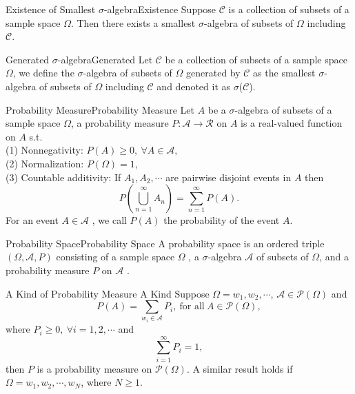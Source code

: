 \documentclass{elegantbook}
\newcommand\dis{\displaystyle}
\newcommand\gs{\geqslant}
\newcommand\sumn{\dis\sum\limits_{n=1}^{\infty}}
\newcommand\sumi{\dis\sum\limits_{i=1}^{\infty}}
\newcommand\ma{\mathcal{A}}
\newcommand\mr{\mathcal{R}}
\begin{document}
\begin{corollary}{Existence of Smallest $\sigma$-algebra}{Existence}
Suppose $\mathcal{C}$ is a collection of subsets of a sample space $\Omega$. Then there exists a smallest $\sigma$-algebra of subsets of $\Omega$ including $\mathcal{C}$.

\end{corollary}

\begin{definition}{Generated $\sigma$-algebra}{Generated}
Let $\mathcal{C}$ be a collection of subsets of a sample space $\Omega$, we define the $\sigma$-algebra of subsets of $\Omega$ generated by $\mathcal{C}$ as the smallest $\sigma$-algebra of subsets of $\Omega$ including $\mathcal{C}$ and denoted it as $\sigma$($\mathcal{C}$).

\end{definition}

\begin{definition}{Probability Measure}{Probability Measure}
Let $A$ be a $\sigma$-algebra of subsets of a sample space $\Omega$, a probability measure $P: \ma\rightarrow\mr$ on $A$ is a real-valued function on $A$ s.t.\\
(1) Nonnegativity: $P(A)\gs0,\ \forall A\in\ma,$ \\
(2) Normalization: $P(\Omega)=1$, \\
(3) Countable additivity: If $A_1,A_2, \cdots$ are pairwise disjoint events in 
$A$ then $$P\left(\bigcup_{n=1}^\infty A_n \right)=\sumn P(A) .$$
For an event $A\in\ma$ , we call $P(A)$ the probability of the event $A$.

\end{definition}

\begin{definition}{Probability Space}{Probability Space}
A probability space is an ordered triple $(\Omega,\ma, P)$ consisting of a sample space $\Omega$ , a $\sigma$-algebra $\ma$  of subsets of $\Omega$, and a probability measure $P$ on $\ma$ .

\end{definition}

\begin{theorem}{A Kind of Probability Measure }{A Kind}
Suppose $\Omega={w_1,w_2,\cdots}$, $\ma\in\mathcal{P}(\Omega)$ and $$P(A)=\sum\limits_{w_i\in\ma}P_i,\  \text{for all}\ A\in\mathcal{P}(\Omega),$$
where $P_i\gs0,\ \forall i=1,2,\cdots$ and $$\sumi P_i =1,$$ then $P$ is a probability measure on $\mathcal{P}(\Omega)$. A similar result holds if $\Omega={w_1,w_2,\cdots,w_N}$, where $N\gs1$.

\end{theorem}
\end{document}
